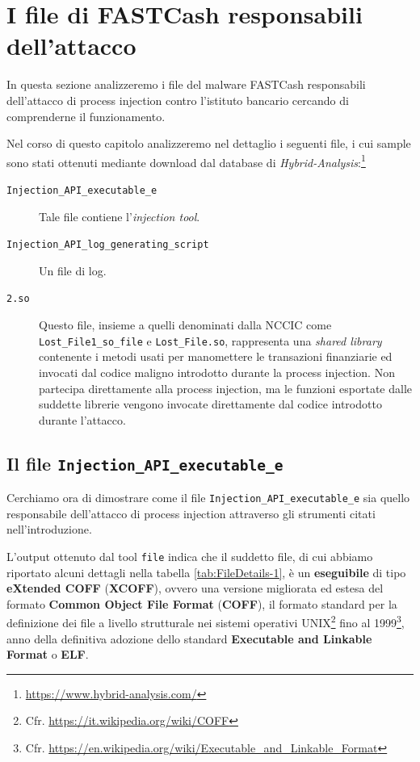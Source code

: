 \documentclass[10pt,a4paper, titlepage]{report}
\begin{document}
\newpage
\section{I file di FASTCash responsabili dell'attacco}

In questa sezione analizzeremo i file del malware FASTCash responsabili dell'attacco di process injection contro l'istituto bancario cercando di comprenderne il funzionamento. 

Nel corso di questo capitolo analizzeremo nel dettaglio i seguenti file, i cui sample sono stati ottenuti mediante download dal database di \textit{Hybrid-Analysis}:\footnote{\url{https://www.hybrid-analysis.com/}}

\begin{description}
\item[\texttt{Injection\_API\_executable\_e}] Tale file contiene l'\textit{injection tool}.
\item[\texttt{Injection\_API\_log\_generating\_script}] Un file di log.
\item[\texttt{2.so}] Questo file, insieme a quelli denominati dalla NCCIC come \texttt{Lost\_File1\_\-so\-\_file} e \texttt{Lost\_File.so}, rappresenta una \textit{shared library} contenente i metodi usati per manomettere le transazioni finanziarie ed invocati dal codice maligno introdotto durante la process injection. Non partecipa direttamente alla process injection, ma le funzioni esportate dalle suddette librerie vengono invocate direttamente dal codice introdotto durante l'attacco. 
\end{description}

\subsection{Il file \texttt{Injection\_API\_executable\_e}}\label{sec:InjectionAPIExecutableE}

Cerchiamo ora di dimostrare come il file \texttt{Injection\_API\_executable\_e} sia quello responsabile dell'attacco di process injection attraverso gli strumenti citati nell'introduzione.

L'output ottenuto dal tool \texttt{file} indica che il suddetto file, di cui abbiamo riportato alcuni dettagli nella tabella \ref{tab:FileDetails-1}, è un \textbf{eseguibile} di tipo \textbf{eXtended COFF} (\textbf{XCOFF}), ovvero una versione migliorata ed estesa del formato \textbf{Common Object File Format} (\textbf{COFF}), il formato standard per la definizione dei file a livello strutturale nei sistemi operativi UNIX\footnote{Cfr. \url{https://it.wikipedia.org/wiki/COFF}} fino al 1999\footnote{Cfr. \url{https://en.wikipedia.org/wiki/Executable\_and\_Linkable\_Format}}, anno della definitiva adozione dello standard \textbf{Executable and Linkable Format} o \textbf{ELF}.
\end{document}
